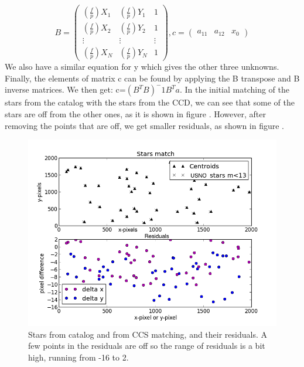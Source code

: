 \documentclass[letterpaper,12pt]{article}
\begin{document}
\begin{equation}
B=
\begin{pmatrix}
  (\frac{f}{p})X_{1}  & (\frac{f}{p})Y_{1}  & 1 \\
  (\frac{f}{p})X_{2}  & (\frac{f}{p})Y_{2}  & 1 \\
  \vdots  & \vdots    & \vdots  \\
  (\frac{f}{p})X_{N}  & (\frac{f}{p})Y_{N} & 1 
 \end{pmatrix}, 
 c=
\begin{pmatrix}
  a_{11} & a_{12} & x_{0}
 \end{pmatrix}
\end{equation}
We also have a similar equation for y which gives the other three unknowns. 
Finally, the elements of matrix c can be found by applying the B transpose and B inverse matrices. We then get:
c=\begin{math}(B^TB)^-1 B^T a \end{math}.
In the initial matching of the stars from the catalog with the stars from the CCD, we can see that some of the stars are off from the other ones, as it is shown in figure . However, after removing the points that are off, we get smaller residuals, as shown in figure .


\FloatBarrier
\begin{figure}[h!]
\centering
\includegraphics[scale=0.5]{stars_match_1.png}
\caption{Stars from catalog and from CCS matching, and their residuals. A few points in the residuals are off so the range of residuals is a bit high, running from -16 to 2.}
\end{figure}
\FloatBarrier
\end{document}
